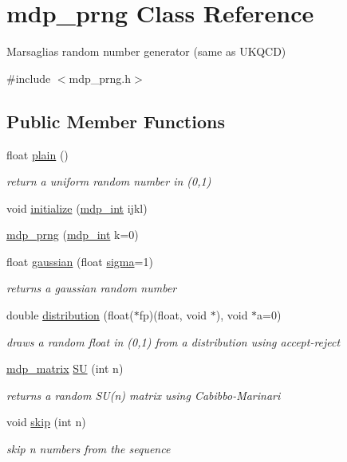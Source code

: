 \hypertarget{classmdp__prng}{}\section{mdp\+\_\+prng Class Reference}
\label{classmdp__prng}


Marsaglia\textquotesingle{}s random number generator (same as U\+K\+Q\+CD)  




{\ttfamily \#include $<$mdp\+\_\+prng.\+h$>$}

\subsection*{Public Member Functions}
\begin{DoxyCompactItemize}
\item 
float \hyperlink{classmdp__prng_a261360660403dcd1a76305a8644b6a2d}{plain} ()
\begin{DoxyCompactList}\small\item\em return a uniform random number in (0,1) \end{DoxyCompactList}\item 
void \hyperlink{classmdp__prng_a2a41d455e32ec21fce0c76f71bda801a}{initialize} (\hyperlink{mdp__global__vars_8h_aaa1ad9d0dcd2124aa5af0120d9954174}{mdp\+\_\+int} ijkl)
\item 
\hyperlink{classmdp__prng_a57739df3a7629078ca66dbfd7ded1b86}{mdp\+\_\+prng} (\hyperlink{mdp__global__vars_8h_aaa1ad9d0dcd2124aa5af0120d9954174}{mdp\+\_\+int} k=0)
\item 
float \hyperlink{classmdp__prng_adf372628df14ef01302472264a7f26d8}{gaussian} (float \hyperlink{fermiqcd__gamma__matrices_8h_ab20455955848cb6945fe37dda0a2ef40}{sigma}=1)
\begin{DoxyCompactList}\small\item\em returns a gaussian random number \end{DoxyCompactList}\item 
double \hyperlink{classmdp__prng_a2ba8807aa153b9b222d6d724da06dfdd}{distribution} (float($\ast$fp)(float, void $\ast$), void $\ast$a=0)
\begin{DoxyCompactList}\small\item\em draws a random float in (0,1) from a distribution using accept-\/reject \end{DoxyCompactList}\item 
\hyperlink{classmdp__matrix}{mdp\+\_\+matrix} \hyperlink{classmdp__prng_a348d0a778f0c1e3dd71e163bad950936}{SU} (int n)
\begin{DoxyCompactList}\small\item\em returns a random S\+U(n) matrix using Cabibbo-\/\+Marinari \end{DoxyCompactList}\item 
void \hyperlink{classmdp__prng_a6214a2e9ed4d3da1e61544501e710999}{skip} (int n)
\begin{DoxyCompactList}\small\item\em skip n numbers from the sequence \end{DoxyCompactList}\end{DoxyCompactItemize}


